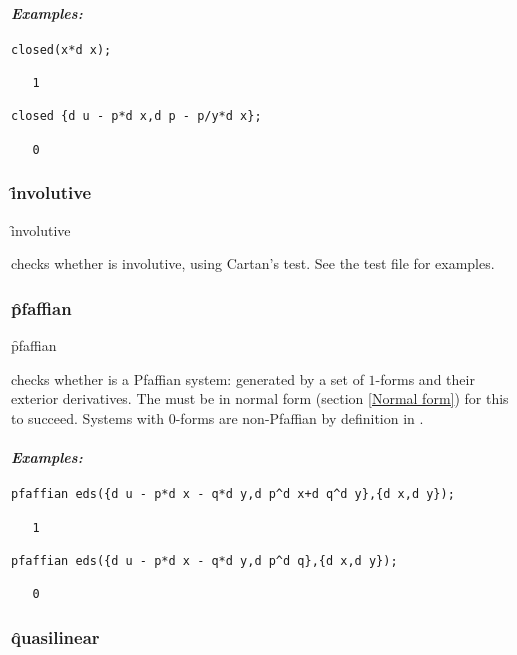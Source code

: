 \paragraph{\textit{Examples:}}
\begin{verbatim}
closed(x*d x);

   1

closed {d u - p*d x,d p - p/y*d x};

   0
\end{verbatim}

\subsubsection{\f{involutive}}
\label{involutive}

\hypertarget{operator:INVOLUTIVE}{}
\begin{syntax}
	\f{involutive} 
\end{syntax}
checks whether  is involutive, using Cartan's test. See the test
file for examples.

\subsubsection{\f{pfaffian}}
\label{pfaffian}

\hypertarget{operator:EDS_PFAFFIAN}{}
\begin{syntax}
	\f{pfaffian} 
\end{syntax}
checks whether  is a Pfaffian system: generated by a set of
$1$-forms and their exterior derivatives. The  must be in normal
form (section \ref{Normal form}) for this to succeed. Systems with 0-forms
are non-Pfaffian by definition in .

\paragraph{\textit{Examples:}}
\begin{verbatim}
pfaffian eds({d u - p*d x - q*d y,d p^d x+d q^d y},{d x,d y});

   1

pfaffian eds({d u - p*d x - q*d y,d p^d q},{d x,d y});

   0
\end{verbatim}

\subsubsection{\f{quasilinear}}
\label{quasilinear}

